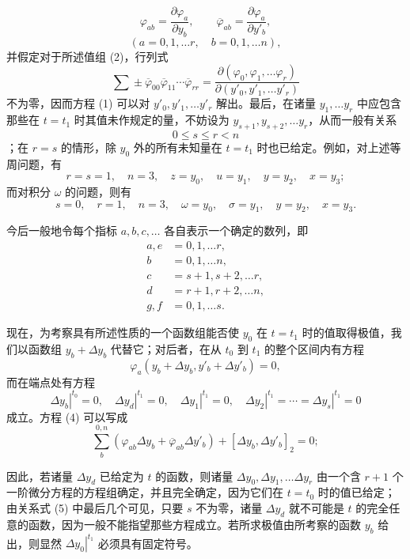 \documentclass[11pt,a4paper,leqno]{article}
\begin{document}
\[
\varphi_{ab}=\frac{\partial\varphi_a}{\partial y_b},\qquad
\overline{\varphi}_{ab}=\frac{\partial\varphi_a}{\partial y'_b},
\]
\[
(a=0,1,\ldots r,\quad b=0,1,\ldots n),
\]
并假定对于所述值组 (2)，行列式
\begin{equation}\tag{3}
\sum\!\pm\overline{\varphi}_{00}\overline{\varphi}_{11}
\cdots\overline{\varphi}_{rr}
=\frac{\partial(\varphi_0,\varphi_1,\ldots\varphi_r)}
{\partial(y'_0,y'_1,\ldots y'_r)}
\end{equation}
不为零，因而方程 (1) 可以对 $y'_0,y'_1,\ldots y'_r$ 解出。最后，在诸量 $y_1,\ldots y_r$ 中应包含那些在 $t=t_1$ 时其值未作规定的量，不妨设为 $y_{s+1},y_{s+2},\ldots y_r$，从而一般有关系
\[
0\leq s\leq r<n
\]
；在 $r=s$ 的情形，除 $y_0$ 外的所有未知量在 $t=t_1$ 时也已给定。例如，对上述等周问题，有
\[
r=s=1,\quad n=3,\quad z=y_0,\quad u=y_1,\quad y=y_2,\quad x=y_3;
\]
而对积分 $\omega$ 的问题，则有
\[
s=0,\quad r=1,\quad n=3,\quad \omega=y_0,\quad \sigma=y_1,
\quad y=y_2,\quad x=y_3.
\]

今后一般地令每个指标 $a,b,c,\ldots$ 各自表示一个确定的数列，即
\[
\begin{aligned}
a,e&=0,1,\ldots r,\\
b&=0,1,\ldots n,\\
c&=s+1,s+2,\ldots r,\\
d&=r+1,r+2,\ldots n,\\
g,f&=0,1,\ldots s.
\end{aligned}
\]

现在，为考察具有所述性质的一个函数组能否使 $y_0$ 在 $t=t_1$ 时的值取得极值，我们以函数组 $y_b+\Delta y_b$ 代替它；对后者，在从 $t_0$ 到 $t_1$ 的整个区间内有方程
\begin{equation}\tag{4}
\varphi_a(y_b+\Delta y_b,y'_b+\Delta y'_b)=0,
\end{equation}
而在端点处有方程
\begin{equation}\tag{5}
\left.\Delta y_b\right|^{t_0}=0,\quad
\left.\Delta y_d\right|^{t_1}=0,\quad
\left.\Delta y_1\right|^{t_1}=0,\quad
\left.\Delta y_2\right|^{t_1}=\cdots=
\left.\Delta y_s\right|^{t_1}=0
\end{equation}
成立。方程 (4) 可以写成
\begin{equation}\tag{6}
\sum_b^{0,n}\left(\varphi_{ab}\Delta y_b+
\overline{\varphi}_{ab}\Delta y'_b\right)
+[\Delta y_b,\Delta y'_b]_2=0;
\end{equation}

因此，若诸量 $\Delta y_d$ 已给定为 $t$ 的函数，则诸量 $\Delta y_0,\Delta y_1,\ldots\Delta y_r$ 由一个含 $r+1$ 个一阶微分方程的方程组确定，并且完全确定，因为它们在 $t=t_0$ 时的值已给定；由关系式 (5) 中最后几个可见，只要 $s$ 不为零，诸量 $\Delta y_d$ 就不可能是 $t$ 的完全任意的函数，因为一般不能指望那些方程成立。若所求极值由所考察的函数 $y_b$ 给出，则显然 $\left.\Delta y_0\right|^{t_1}$ 必须具有固定符号。
\end{document}
